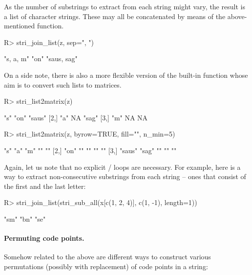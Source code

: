 \documentclass[nojss]{jss}\usepackage[]{graphicx}\usepackage[]{color}
\begin{document}
As the number of substrings to extract from each string might vary,
the result is a list
of character strings. These may all be concatenated by means of the
above-mentioned  function.

\begin{Schunk}
\begin{Sinput}
R> stri_join_list(z, sep=", ")
\end{Sinput}
\begin{Soutput}
[1] "s, a, m"   "on"        "saus, sag"
\end{Soutput}
\end{Schunk}


On a side note, there is also a more flexible version
of the built-in  function whose
aim is to convert such lists to matrices.

\begin{Schunk}
\begin{Sinput}
R> stri_list2matrix(z)
\end{Sinput}
\begin{Soutput}
     [,1] [,2] [,3]
[1,] "s"  "on" "saus"
[2,] "a"  NA   "sag"
[3,] "m"  NA   NA
\end{Soutput}
\begin{Sinput}
R> stri_list2matrix(z, byrow=TRUE, fill="", n_min=5)
\end{Sinput}
\begin{Soutput}
     [,1]   [,2]  [,3] [,4] [,5]
[1,] "s"    "a"   "m"  ""   ""
[2,] "on"   ""    ""   ""   ""
[3,] "saus" "sag" ""   ""   ""
\end{Soutput}
\end{Schunk}


Again, let us note that no explicit / loops are necessary.
For example, here is a way to extract non-consecutive substrings from each string --
ones that consist of the first and the last letter:

\begin{Schunk}
\begin{Sinput}
R> stri_join_list(stri_sub_all(x[c(1, 2, 4)], c(1, -1), length=1))
\end{Sinput}
\begin{Soutput}
[1] "sm" "bn" "se"
\end{Soutput}
\end{Schunk}


\paragraph{Permuting code points.}
Somehow related to the above are different ways to construct
various permutations (possibly with replacement) of code points in a string:
\end{document}
